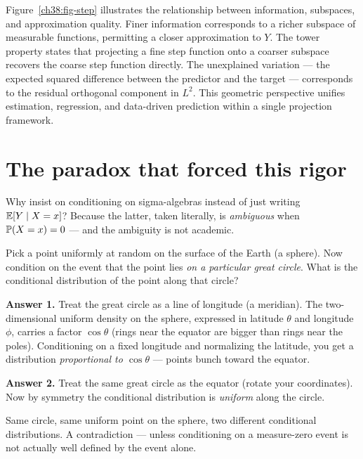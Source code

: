 \begin{aestheticbox}
Figure~\ref{ch38:fig-step} illustrates the relationship between information,
subspaces, and approximation quality. Finer information corresponds to a richer
subspace of measurable functions, permitting a closer approximation to $Y$.
The tower property states that projecting a fine step function onto a coarser
subspace recovers the coarse step function directly. The unexplained variation ---
the expected squared difference between the predictor and the target --- corresponds
to the residual orthogonal component in $L^2$. This geometric perspective unifies
estimation, regression, and data-driven prediction within a single projection framework.
\end{aestheticbox}

\section{The paradox that forced this rigor}
\label{ch38:borel-kolmogorov}

Why insist on conditioning on sigma-algebras instead of just writing $\E[Y \given X = x]$? Because the
latter, taken literally, is \emph{ambiguous} when $\P(X = x) = 0$ --- and the ambiguity is not
academic.

\begin{paradoxbox}
Pick a point uniformly at random on the surface of the Earth (a sphere). Now condition on the event
that the point lies \emph{on a particular great circle}. What is the conditional distribution of the
point along that circle?

\textbf{Answer 1.} Treat the great circle as a line of longitude (a meridian). The two-dimensional
uniform density on the sphere, expressed in latitude $\theta$ and longitude $\phi$, carries a factor
$\cos\theta$ (rings near the equator are bigger than rings near the poles). Conditioning on a fixed
longitude and normalizing the latitude, you get a distribution \emph{proportional to $\cos\theta$} ---
points bunch toward the equator.

\textbf{Answer 2.} Treat the same great circle as the equator (rotate your coordinates). Now by
symmetry the conditional distribution is \emph{uniform} along the circle.

Same circle, same uniform point on the sphere, two different conditional distributions. A
contradiction --- unless conditioning on a measure-zero event is not actually well defined by the
event alone.
\end{paradoxbox}

